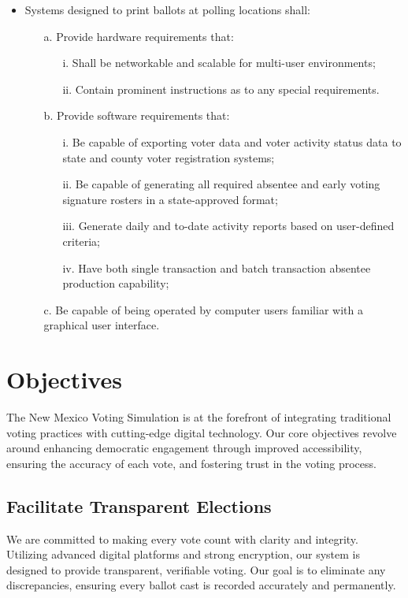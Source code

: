 \documentclass{article}
\begin{document}
\begin{itemize}
    \item Systems designed to print ballots at polling locations shall:
    \begin{itemize}
        \item[a.] Provide hardware requirements that:
        \begin{itemize}
            \item[i.] Shall be networkable and scalable for multi-user environments;
            \item[ii.] Contain prominent instructions as to any special requirements.
        \end{itemize}
        \item[b.] Provide software requirements that:
        \begin{itemize}
            \item[i.] Be capable of exporting voter data and voter activity status data to state and county voter registration systems;
            \item[ii.] Be capable of generating all required absentee and early voting signature rosters in a state-approved format;
            \item[iii.] Generate daily and to-date activity reports based on user-defined criteria;
            \item[iv.] Have both single transaction and batch transaction absentee production capability;
        \end{itemize}
        \item[c.] Be capable of being operated by computer users familiar with a graphical user interface.
    \end{itemize}
\end{itemize}

\section{Objectives}
The New Mexico Voting Simulation is at the forefront of integrating traditional voting practices with cutting-edge digital technology. Our core objectives revolve around enhancing democratic engagement through improved accessibility, ensuring the accuracy of each vote, and fostering trust in the voting process.

\subsection{Facilitate Transparent Elections}
We are committed to making every vote count with clarity and integrity. Utilizing advanced digital platforms and strong encryption, our system is designed to provide transparent, verifiable voting. Our goal is to eliminate any discrepancies, ensuring every ballot cast is recorded accurately and permanently.
\end{document}
